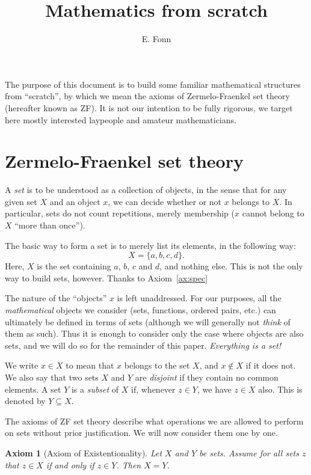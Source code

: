 \documentclass[a4paper, twoside, notitlepage, 11pt]{article}
\title{Mathematics from scratch}
\author{E. Fonn}
\theoremstyle{plain}
\newtheorem{ax}[prop]{Axiom}
\theoremstyle{definition}
\theoremstyle{remark}
\numberwithin{equation}{section}
\begin{document}
\maketitle

The purpose of this document is to build some familiar mathematical structures from ``scratch'', by which we
mean the axioms of Zermelo-Fraenkel set theory (hereafter known as ZF). It is not our intention to be fully
rigorous, we target here mostly interested laypeople and amateur mathematicians.

\section{Zermelo-Fraenkel set theory}

A {\em set} is to be understood as a collection of objects, in the sense that for any given set $X$ and an
object $x$, we can decide whether or not $x$ belongs to $X$. In particular, sets do not count repetitions,
merely membership ($x$ cannot belong to $X$ ``more than once'').

The basic way to form a set is to merely list its elements, in the following way:
\[
    X = \{a,b,c,d\}.
\]
Here, $X$ is the set containing $a$, $b$, $c$ and $d$, and nothing else. This is not the only way to build
sets, however. Thanks to Axiom~\ref{ax:spec}

The nature of the ``objects'' $x$ is left unaddressed. For our purposes, all the {\em mathematical} objects we
consider (sets, functions, ordered pairs, etc.) can ultimately be defined in terms of sets (although we will
generally not {\em think} of them as such). Thus it is enough to consider only the case where objects are also
sets, and we will do so for the remainder of this paper. {\em Everything is a set!}

We write $x\in X$ to mean that $x$ belongs to the set $X$, and $x\not\in X$ if it does not. We also say that
two sets $X$ and $Y$ are {\em disjoint} if they contain no common elements. A set $Y$ is a {\em subset} of $X$
if, whenever $z\in Y$, we have $z\in X$ also. This is denoted by $Y \subseteq X$.

The axioms of ZF set theory describe what operations we are allowed to perform on sets without prior
justification. We will now consider them one by one.

\begin{ax}[Axiom of Existentionality] \label{ax:ex}
Let $X$ and $Y$ be sets. Assume for all sets $z$ that $z\in X$ if and only if $z\in Y$. Then $X=Y$.
\end{ax}
\end{document}
